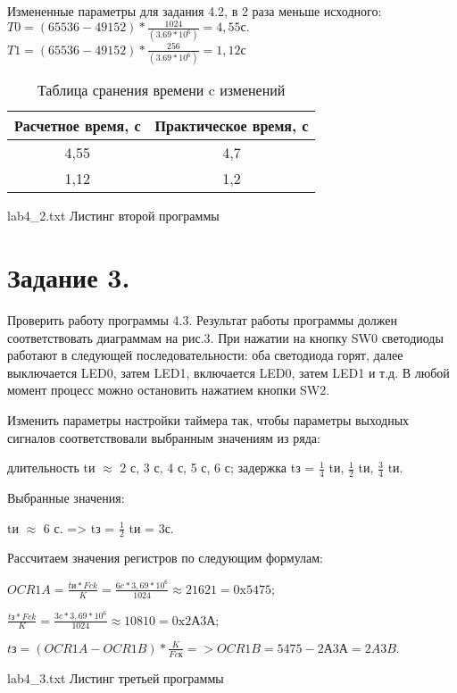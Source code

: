 \documentclass{bmstu}
\begin{document}
Измененные параметры для задания 4.2, в 2 раза меньше исходного: \\ 
$T0 = (65536 - 49152) * \frac{1024}{(3.69 * 10^6)} = 4,55с. $ \\
$T1 = (65536 - 49152) * \frac{256}{(3.69 * 10^6)} = 1,12с$


\begin{table}[H]
\caption{Таблица сранения времени c изменений}
\label{table:eq_table_2}
\begin{tabular}{| c | c |}
	\hline
		Расчетное время, с & Практическое время, с \\
	\hline	
		4,55 & 4,7 \\
	\hline
		1,12 & 1,2 \\
	\hline
\end{tabular}
\end{table}

	{lab4_2.txt}
	{Листинг второй программы}

\chapter{Задание 3.}

Проверить работу программы 4.3. Результат работы программы должен соответствовать диаграммам на рис.3. При нажатии 
на кнопку SW0 светодиоды работают в следующей последовательности: оба светодиода горят, далее выключается LED0, 
затем LED1, включается LED0, затем LED1 и т.д. В любой момент процесс можно остановить нажатием кнопки SW2. 

Изменить параметры настройки таймера так, чтобы параметры выходных сигналов соответствовали выбранным значениям из 
ряда: 

длительность tи $\approx$ 2 с, 3 с, 4 с, 5 с, 6 с; 
задержка tз = $ \frac{1}{4} $ tи, 
$\frac{1}{2}$ tи, $\frac{3}{4}$ tи.

Выбранные значения: 

tи $\approx$ 6 с. => tз = $\frac{1}{2}$ tи = 3с. 

Рассчитаем значения регистров по следующим формулам: 

$OCR1A=\frac{tи*Fck}{K}=\frac{6c * 3,69 * 10^6}{1024} \approx 21621= \text{0x5475};$ 

$\frac{tз*Fck}{K} = \frac{3c * 3,69 * 10^6}{1024} \approx 10810= \text{0x2А3А}; $

$tз= (OCR1A - OCR1B) * \frac{K}{Fcк} => OCR1B = 5475 - \text{2А3А} = 2A3B. $

	{lab4_3.txt}
	{Листинг третьей программы}
\end{document}
